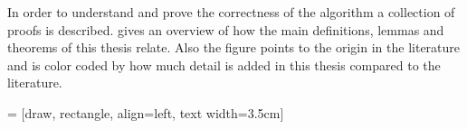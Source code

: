\documentclass[twoside,11pt,openright]{report}
\begin{document}
In order to understand and prove the correctness of the algorithm a collection of proofs is described.  gives an overview of how the main definitions, lemmas and theorems of this thesis relate. Also the figure points to the origin in the literature and is color coded by how much detail is added in this thesis compared to the literature.

\setlength{\tabcolsep}{3pt}
 = [draw, rectangle, align=left, text width=3.5cm]
\newcommand{\nodecontent}[3]{%
  \parbox{3.5cm}{%
    \begin{tabular}{l p{2.2cm}}
      \multicolumn{2}{p{3.3cm}}{#1} \\
      \textit{Reference:} & #2 \\
      \textit{Literature:} & #3 \\
    \end{tabular}
  }%
}%
\newcommand{\coloredbox}[1] {\item[\mbox{\ooalign{\color{#1}\ding{110}\cr\hidewidth\color{black}$\square$\hidewidth\cr}}]}%
\end{document}
